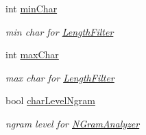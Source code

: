 \begin{CompactItemize}
int \hyperlink{classla__manager_1_1LAConfiguration_7681232dc980fbacce77c82737244d86}{minChar}
\begin{CompactList}\small\item\em min char for \hyperlink{classla__manager_1_1LengthFilter}{LengthFilter} \item\end{CompactList}\item 
int \hyperlink{classla__manager_1_1LAConfiguration_fe9988d04c6006eb2ba27d8b74163eb1}{maxChar}
\begin{CompactList}\small\item\em max char for \hyperlink{classla__manager_1_1LengthFilter}{LengthFilter} \item\end{CompactList}\item 
bool \hyperlink{classla__manager_1_1LAConfiguration_085289667cf940da6e1ca45c16cacfac}{charLevelNgram}
\begin{CompactList}\small\item\em ngram level for \hyperlink{classla__manager_1_1NGramAnalyzer}{NGramAnalyzer} \item\end{CompactList}\end{CompactItemize}
